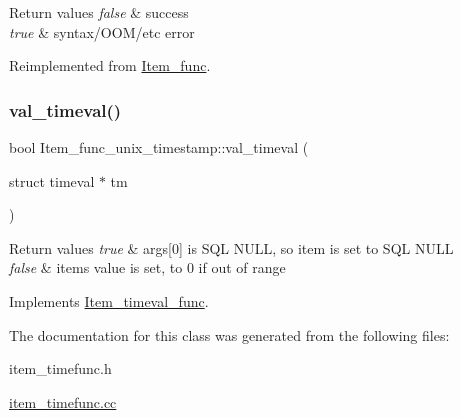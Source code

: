 \begin{DoxyRetVals}{Return values}
{\em false} & success \\
\hline
{\em true} & syntax/\+O\+O\+M/etc error \\
\hline
\end{DoxyRetVals}


Reimplemented from \mbox{\hyperlink{classItem__func_a6413cdbe7b14be77cc47462c9fc87ddb}{Item\+\_\+func}}.

\mbox{\label{classItem__func__unix__timestamp_ac21ec2e7b716887f359bffd70f937187}} 
\subsubsection{\texorpdfstring{val\+\_\+timeval()}{val\_timeval()}}
{\footnotesize\ttfamily bool Item\+\_\+func\+\_\+unix\+\_\+timestamp\+::val\+\_\+timeval (\begin{DoxyParamCaption}\item[{struct timeval $\ast$}]{tm }\end{DoxyParamCaption})\hspace{0.3cm}{\ttfamily [virtual]}}


\begin{DoxyRetVals}{Return values}
{\em true} & args\mbox{[}0\mbox{]} is S\+QL N\+U\+LL, so item is set to S\+QL N\+U\+LL \\
\hline
{\em false} & item\textquotesingle{}s value is set, to 0 if out of range \\
\hline
\end{DoxyRetVals}


Implements \mbox{\hyperlink{classItem__timeval__func_a529c82bce0479faa4b598d3a801645ca}{Item\+\_\+timeval\+\_\+func}}.



The documentation for this class was generated from the following files\+:\begin{DoxyCompactItemize}
\item 
item\+\_\+timefunc.\+h\item 
\mbox{\hyperlink{item__timefunc_8cc}{item\+\_\+timefunc.\+cc}}\end{DoxyCompactItemize}
